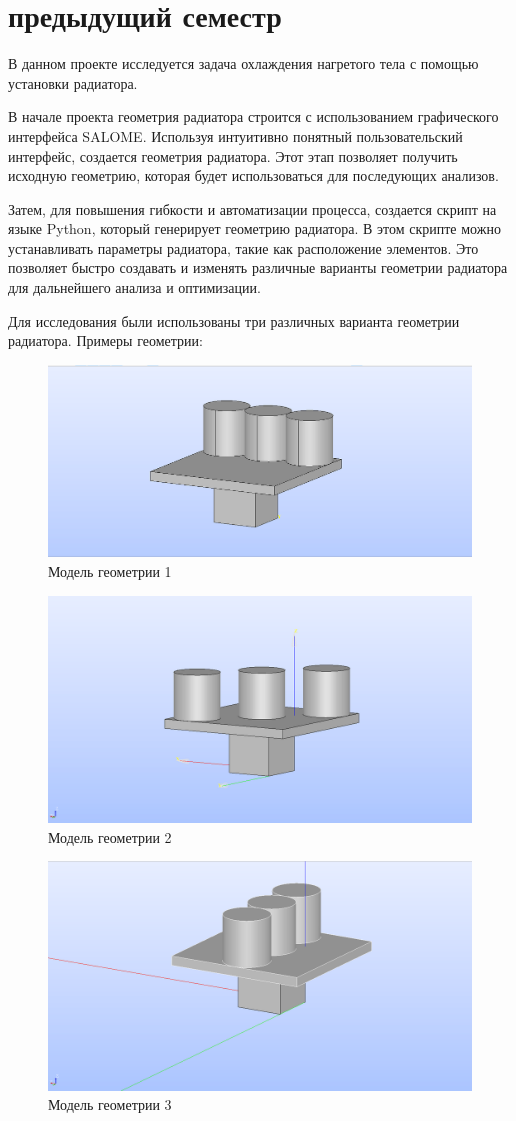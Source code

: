 \documentclass[a4paper,12pt]{article}
\theoremstyle{plain} %
\theoremstyle{definition} %
\theoremstyle{remark} %
\begin{document}
\newpage
\section{предыдущий семестр}

В данном проекте исследуется задача охлаждения нагретого тела с помощью установки радиатора.

В начале проекта геометрия радиатора строится с использованием графического интерфейса SALOME. Используя интуитивно понятный пользовательский интерфейс, создается геометрия радиатора. Этот этап позволяет получить исходную геометрию, которая будет использоваться для последующих анализов.

Затем, для повышения гибкости и автоматизации процесса, создается скрипт на языке Python, который генерирует геометрию радиатора. В этом скрипте можно устанавливать параметры радиатора, такие как расположение элементов. Это позволяет быстро создавать и изменять различные варианты геометрии радиатора для дальнейшего анализа и оптимизации.

Для исследования были использованы три различных варианта геометрии радиатора.
Примеры геометрии:
\begin{figure}[h]
	\begin{center}
		\includegraphics[width=0.5\linewidth]{1.1.png}
		\caption{Модель геометрии 1} %
	\end{center}
\end{figure}
\begin{figure}[h]
	\begin{center}
		\includegraphics[width=0.5\linewidth]{1.2.png}
		\caption{Модель геометрии 2}
	\end{center}
\end{figure}
\begin{figure}[h]
	\begin{center}
		\includegraphics[width=0.5\linewidth]{1.3.png}
		\caption{Модель геометрии 3}
	\end{center}
\end{figure}
\newpage
\end{document}
